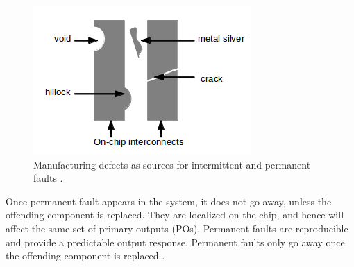 \begin{figure}[h]
  \begin{center}
    \captionsetup{justification=centering}
    \includegraphics[scale=0.75]{figures/mfgdefects.png}
    \caption{Manufacturing defects as sources for intermittent and permanent faults \cite{Lehtonen2009}.}
    \label{fig:mfgdefects}
  \end{center}
\end{figure}

Once permanent fault appears in the system, it does not go away, unless the offending component is replaced. They are localized on the chip, and hence will affect the same set of primary outputs (POs). Permanent faults are reproducible and provide a predictable output response. Permanent faults only go away once the offending component is replaced \cite{Constantinescu2007}.

